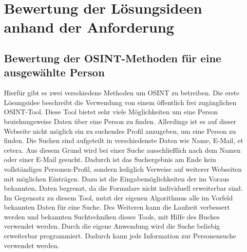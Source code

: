 

\chapter{Bewertung der Lösungsideen anhand der Anforderung}  %
\label{cha:BewertungLösungsideenAnhandAnforderung} %

\section{Bewertung der OSINT-Methoden für eine ausgewählte Person}
Hierfür gibt es zwei verschiedene Methoden um OSINT zu betreiben. Die erste Lösungsidee beschreibt die Verwendung von einem öffentlich frei zugänglichen OSINT-Tool. Diese Tool bietet sehr viele Möglichkeiten um eine Person beziehungsweise Daten über eine Person zu finden. Allerdings ist es auf dieser Webseite nicht möglich ein zu suchendes Profil anzugeben, um eine Person zu finden. Die Suchen sind aufgeteilt in verschiedenste Daten wie Name, E-Mail, et cetera. Aus diesem Grund wird bei einer Suche ausschließlich nach dem Namen oder einer E-Mail gesucht. Dadurch ist das Suchergebnis am Ende kein vollständiges Personen-Profil, sondern lediglich Verweise auf weiterer Webseiten mit möglichen Einträgen. Dazu ist die Eingabemöglichkeiten der im Voraus bekannten, Daten begrenzt, da die Formulare nicht individuell erweiterbar sind.\\
Im Gegensatz zu diesem Tool, nutzt der eigenen Algorithmus alle im Vorfeld bekannten Daten für eine Suche. Des Weiteren kann die Laufzeit verbessert werden und bekannten Suchtechniken dieses Tools, mit Hilfe des Buches \cite{Bazzell} verwendet werden. Durch die eigene Anwendung wird die Suche beliebig erweiterbar programmiert. Dadurch kann jede Information zur Personensuche verwendet werden.

